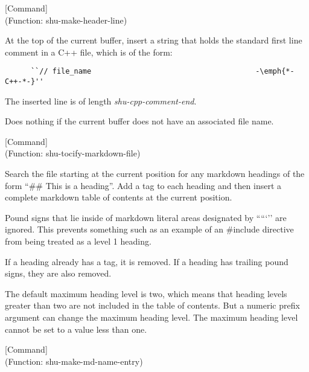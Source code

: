 \vspace{1em}
\noindent
{}
\usebox{\funcname}
 \hfill [Command]\\%
 (Function: shu-make-header-line)

\begin{doc-string}
At the top of the current buffer, insert a string that holds the standard
first line comment in a C++ file, which is of the form:

\small{\begin{verbatim}
      ``// file_name                                      -\emph{*-C++-*-}''
\end{verbatim}}

The inserted line is of length \emph{shu-cpp-comment-end}.

Does nothing if the current buffer does not have an associated file name.
\end{doc-string}

\vspace{1em}
\noindent
{}
\usebox{\funcname}
 \hfill [Command]\\%
 (Function: shu-tocify-markdown-file)

\begin{doc-string}
Search the file starting at the current position for any markdown headings of
the form ``\#\# This is a heading''.  Add a tag to each heading and then insert a
complete markdown table of contents at the current position.

Pound signs that lie inside of markdown literal areas designated by `````'' are
ignored.  This prevents something such as an example of an \#include directive
from being treated as a level 1 heading.

If a heading already has a tag, it is removed.  If a heading has trailing pound
signs, they are also removed.

The default maximum heading level is two, which means that heading levels
greater than two are not included in the table of contents.  But a numeric
prefix argument can change the maximum heading level.  The maximum heading level
cannot be set to a value less than one.
\end{doc-string}

\vspace{1em}
\noindent
{}
\usebox{\funcname}
 \hfill [Command]\\%
 (Function: shu-make-md-name-entry)

